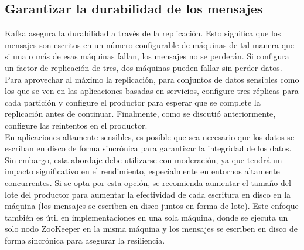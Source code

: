 \documentclass{article}
\begin{document}
\subsection{Garantizar la durabilidad de los mensajes}
Kafka asegura la durabilidad a través de la replicación. Esto significa que los mensajes son escritos en un número configurable de máquinas de tal manera que si una o más de esas máquinas fallan, los mensajes no se perderán. Si configura un factor de replicación de tres, dos máquinas pueden fallar sin perder datos.\\

Para aprovechar al máximo la replicación, para conjuntos de datos sensibles como los que se ven en las aplicaciones basadas en servicios, configure tres réplicas para cada partición y configure el productor para esperar que se complete la replicación antes de continuar. Finalmente, como se discutió anteriormente, configure las reintentos en el productor.\\

En aplicaciones altamente sensibles, es posible que sea necesario que los datos se escriban en disco de forma sincrónica para garantizar la integridad de los datos. Sin embargo, esta abordaje debe utilizarse con moderación, ya que tendrá un impacto significativo en el rendimiento, especialmente en entornos altamente concurrentes. Si se opta por esta opción, se recomienda aumentar el tamaño del lote del productor para aumentar la efectividad de cada escritura en disco en la máquina (los mensajes se escriben en disco juntos en forma de lote). Este enfoque también es útil en implementaciones en una sola máquina, donde se ejecuta un solo nodo ZooKeeper en la misma máquina y los mensajes se escriben en disco de forma sincrónica para asegurar la resiliencia.
\end{document}
